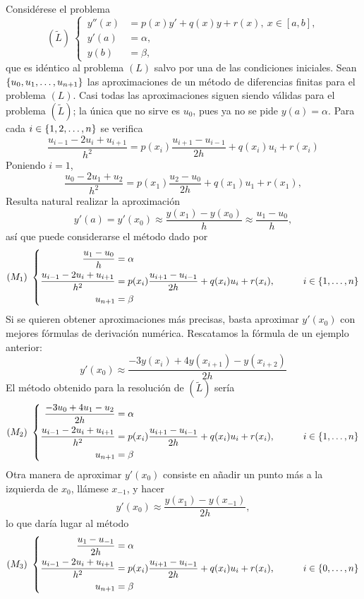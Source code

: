 \documentclass[11pt]{report}
\theoremstyle{mytheorem}
\theoremstyle{mydefinition}
\theoremstyle{myexample}
\begin{document}
Considérese el problema
\[(\widetilde{L}) \ \left\{
\begin{alignedat}{1}
\, y''(x)  &= p(x)y'+q(x)y+r(x), \ x \in [a,b], \\
\, y'(a) &= \alpha, \\
\, y(b) &= \beta,
\end{alignedat}\right.\]
que es idéntico al problema $(L)$ salvo por una de las condiciones iniciales. Sean $\{u_0,u_1,\mathellipsis,u_{n+1}\}$ las aproximaciones de un método de diferencias finitas para el problema $(L)$. Casi todas las aproximaciones siguen siendo válidas para el problema $(\widetilde{L})$; la única que no sirve es $u_0$, pues ya no se pide $y(a)=\alpha$. Para cada $i \in \{1,2,\mathellipsis,n\}$ se verifica
\[\frac{u_{i-1}-2u_i+u_{i+1}}{h^2} = p(x_i)\frac{u_{i+1}-u_{i-1}}{2h}+q(x_i)u_i+r(x_i)\]
Poniendo $i = 1$,
\[\frac{u_{0}-2u_1+u_{2}}{h^2} = p(x_1)\frac{u_{2}-u_{0}}{2h}+q(x_1)u_1+r(x_1),\]
Resulta natural realizar la aproximación
\[y'(a)=y'(x_0) \approx \frac{y(x_1)-y(x_0)}{h} \approx \frac{u_1-u_0}{h},\]
así que puede considerarse el método dado por
\[
(M_1) \ \left\{ \begin{alignedat}{1}
\frac{u_1-u_0}{h} &= \alpha \\
\frac{u_{i-1}-2u_i+u_{i+1}}{h^2} &= p(x_i)\frac{u_{i+1}-u_{i-1}}{2h}+q(x_i)u_i+r(x_i), \quad \quad \quad i \in \{1,\mathellipsis,n\} \\
u_{n+1} &=\beta
\end{alignedat} \right.
\]
Si se quieren obtener aproximaciones más precisas, basta aproximar $y'(x_0)$ con mejores fórmulas de derivación numérica. Rescatamos la fórmula de un ejemplo anterior:
\[y'(x_0) \approx \frac{-3y(x_i)+4y(x_{i+1})-y(x_{i+2})}{2h}\]
El método obtenido para la resolución de $(\widetilde{L})$ sería
\[
(M_2) \ \left\{ \begin{alignedat}{1}
    \frac{-3u_0+4u_{1}-u_{2}}{2h} &= \alpha \\
\frac{u_{i-1}-2u_i+u_{i+1}}{h^2} &= p(x_i)\frac{u_{i+1}-u_{i-1}}{2h}+q(x_i)u_i+r(x_i), \quad \quad \quad i \in \{1,\mathellipsis,n\} \\
u_{n+1} &=\beta
\end{alignedat} \right.
\]
Otra manera de aproximar $y'(x_0)$ consiste en añadir un punto más a la izquierda de $x_0$, llámese $x_{-1}$, y hacer
\[y'(x_0) \approx \frac{y(x_1)-y(x_{-1})}{2h},\]
lo que daría lugar al método
\[
(M_3) \ \left\{ \begin{alignedat}{1}
\frac{u_1-u_{-1}}{2h} &= \alpha \\
\frac{u_{i-1}-2u_i+u_{i+1}}{h^2} &= p(x_i)\frac{u_{i+1}-u_{i-1}}{2h}+q(x_i)u_i+r(x_i), \quad \quad \quad i \in \{0,\mathellipsis,n\} \\
u_{n+1} &=\beta
\end{alignedat} \right.
\]
\end{document}
